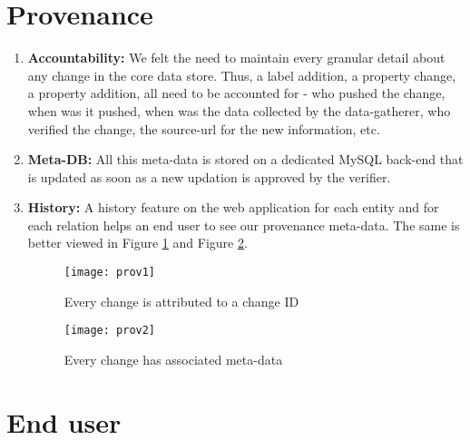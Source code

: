 \section{Provenance}
\label{sectionprov}

\begin{enumerate}

\item \textbf{Accountability:} We felt the need to maintain every granular detail about any change in the core data store. Thus, a label addition, a property change, a property addition, all need to be accounted for - who pushed the change, when was it pushed, when was the data collected by the data-gatherer, who verified the change, the source-url for the new information, etc.

\item \textbf{Meta-DB:} All this meta-data is stored on a dedicated MySQL back-end that is updated as soon as a new updation is approved by the verifier. 

\item \textbf{History:} A history feature on the web application for each entity and for each relation helps an end user to see our provenance meta-data. The same is better viewed in Figure \ref{fig:prov1} and Figure \ref{fig:prov2}.

\begin{figure}[H]
\begin{center}  
\texttt{[image: prov1]} 
\caption{Every change is attributed to a change ID}
\label{fig:prov1}
\end{center}
\end{figure}


\begin{figure}[H]
\begin{center}  
\texttt{[image: prov2]} 
\caption{Every change has associated meta-data}
\label{fig:prov2}
\end{center}
\end{figure}


\end{enumerate}





\section{End user}

